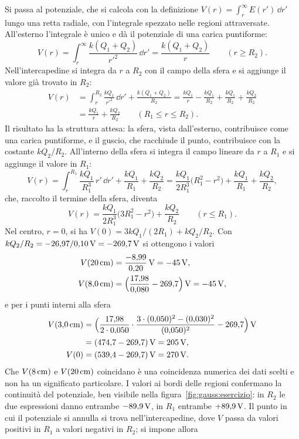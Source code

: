 \documentclass[11pt,a4paper]{article}
\begin{document}
Si passa al potenziale, che si calcola con la definizione $V(r)=\int_r^\infty E(r')\,\dd r'$ lungo una retta radiale, con l'integrale spezzato nelle regioni attraversate. All'esterno l'integrale è unico e dà il potenziale di una carica puntiforme:
\[
V(r)=\int_r^\infty\frac{k(Q_1+Q_2)}{r'^2}\,\dd r'=\frac{k(Q_1+Q_2)}{r}\qquad(r\ge R_2).
\]
Nell'intercapedine si integra da $r$ a $R_2$ con il campo della sfera e si aggiunge il valore già trovato in $R_2$:
\begin{align*}
V(r)&=\int_r^{R_2}\frac{kQ_1}{r'^2}\,\dd r'+\frac{k(Q_1+Q_2)}{R_2}=\frac{kQ_1}{r}-\frac{kQ_1}{R_2}+\frac{kQ_1}{R_2}+\frac{kQ_2}{R_2}\\
&=\frac{kQ_1}{r}+\frac{kQ_2}{R_2}\qquad(R_1\le r\le R_2).
\end{align*}
Il risultato ha la struttura attesa: la sfera, vista dall'esterno, contribuisce come una carica puntiforme, e il guscio, che racchiude il punto, contribuisce con la costante $kQ_2/R_2$. All'interno della sfera si integra il campo lineare da $r$ a $R_1$ e si aggiunge il valore in $R_1$:
\[
V(r)=\int_r^{R_1}\frac{kQ_1}{R_1^3}\,r'\,\dd r'+\frac{kQ_1}{R_1}+\frac{kQ_2}{R_2}=\frac{kQ_1}{2R_1^3}\bigl(R_1^2-r^2\bigr)+\frac{kQ_1}{R_1}+\frac{kQ_2}{R_2},
\]
che, raccolto il termine della sfera, diventa
\[
V(r)=\frac{kQ_1}{2R_1^3}\bigl(3R_1^2-r^2\bigr)+\frac{kQ_2}{R_2}\qquad(r\le R_1).
\]
Nel centro, $r=0$, si ha $V(0)=3kQ_1/(2R_1)+kQ_2/R_2$. Con $kQ_2/R_2=-26{,}97/0{,}10\,\mathrm{V}=-269{,}7\,\mathrm{V}$ si ottengono i valori
\begin{align*}
V(20\,\mathrm{cm})&=\frac{-8{,}99}{0{,}20}\,\mathrm{V}=-45\,\mathrm{V},\\
V(8{,}0\,\mathrm{cm})&=\Bigl(\frac{17{,}98}{0{,}080}-269{,}7\Bigr)\,\mathrm{V}=-45\,\mathrm{V},
\end{align*}
e per i punti interni alla sfera
\begin{align*}
V(3{,}0\,\mathrm{cm})&=\Bigl(\frac{17{,}98}{2\cdot0{,}050}\cdot\frac{3\cdot(0{,}050)^2-(0{,}030)^2}{(0{,}050)^2}-269{,}7\Bigr)\,\mathrm{V}\\
&=(474{,}7-269{,}7)\,\mathrm{V}=205\,\mathrm{V},\\
V(0)&=(539{,}4-269{,}7)\,\mathrm{V}=270\,\mathrm{V}.
\end{align*}
Che $V(8\,\mathrm{cm})$ e $V(20\,\mathrm{cm})$ coincidano è una coincidenza numerica dei dati scelti e non ha un significato particolare. I valori ai bordi delle regioni confermano la continuità del potenziale, ben visibile nella figura~\ref{fig:gauss:esercizio}: in $R_2$ le due espressioni danno entrambe $-89{,}9\,\mathrm{V}$, in $R_1$ entrambe $+89{,}9\,\mathrm{V}$. Il punto in cui il potenziale si annulla si trova nell'intercapedine, dove $V$ passa da valori positivi in $R_1$ a valori negativi in $R_2$; si impone allora
\end{document}
